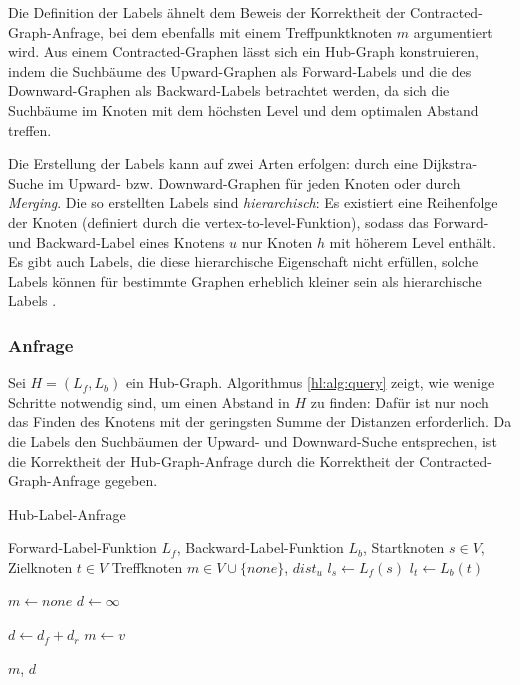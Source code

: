 Die Definition der Labels ähnelt dem Beweis der Korrektheit der Contracted-Graph-Anfrage, bei dem ebenfalls mit einem Treffpunktknoten $m$ argumentiert wird.
Aus einem Contracted-Graphen lässt sich ein Hub-Graph konstruieren, indem die Suchbäume des Upward-Graphen als Forward-Labels und die des Downward-Graphen als Backward-Labels betrachtet werden, da sich die Suchbäume im Knoten mit dem höchsten Level und dem optimalen Abstand treffen.

Die Erstellung der Labels kann auf zwei Arten erfolgen: durch eine Dijkstra-Suche im Upward- bzw. Downward-Graphen für jeden Knoten oder durch \emph{Merging}.
Die so erstellten Labels sind \emph{hierarchisch}:
Es existiert eine Reihenfolge der Knoten (definiert durch die vertex-to-level-Funktion), sodass das Forward- und Backward-Label eines Knotens $u$ nur Knoten $h$ mit höherem Level enthält.
Es gibt auch Labels, die diese hierarchische Eigenschaft nicht erfüllen, solche Labels können für bestimmte Graphen erheblich kleiner sein als hierarchische Labels \cite{goldberg2013separating}.

\subsubsection{Anfrage}

Sei $H = (L_f, L_b)$ ein Hub-Graph.
Algorithmus \ref{hl:alg:query} zeigt, wie wenige Schritte notwendig sind, um einen Abstand in $H$ zu finden: Dafür ist nur noch das Finden des Knotens mit der geringsten Summe der Distanzen erforderlich.
Da die Labels den Suchbäumen der Upward- und Downward-Suche entsprechen, ist die Korrektheit der Hub-Graph-Anfrage durch die Korrektheit der Contracted-Graph-Anfrage gegeben.

\begin{algorithm}[ht]
  \caption{Hub-Label-Anfrage}
  \begin{algorithmic}[1]
    \Require Forward-Label-Funktion $L_f$, Backward-Label-Funktion $L_b$, Startknoten $s \in V$, Zielknoten $t \in V$
    \Ensure Treffknoten $m \in V \cup \{ {none} \}$, ${dist}_u$
    \State $l_s \leftarrow L_f (s)$
    \State $l_t \leftarrow L_b (t)$

    \State
    \State $m \leftarrow {none}$
    \State $d \leftarrow \infty$

    \State $d \leftarrow d_f + d_r$
    \State $m \leftarrow v$
    \EndIf
    \EndFor

    \State
    \State \Return $m$, $d$
  \end{algorithmic}
  \label{hl:alg:query}
\end{algorithm}

